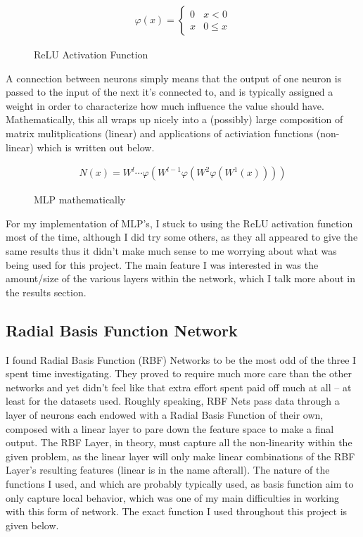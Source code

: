\documentclass[12pt, twoside]{report}
\begin{document}
\begin{figure}[H]
    \centering
    \begin{align}
        \varphi(x) = \begin{cases} 
            0 & x < 0 \\
            x & 0 \leq x
        \end{cases}
    \end{align}
    \caption*{ReLU Activation Function}
\end{figure}

A connection between neurons simply means that the output of one neuron is passed to the input of the next
it's connected to, and is typically assigned a weight in order to characterize how much influence the value
should have. Mathematically, this all wraps up nicely into a (possibly) large composition of matrix 
mulitplications (linear) and applications of activiation functions (non-linear) which is written out
below.

\begin{figure}[H]
    \centering
    \begin{align}
        N(x) = W^l \cdots \varphi(W^{l-1} \varphi(W^2\varphi(W^1(x))))
    \end{align}
    \caption*{MLP mathematically}
\end{figure}

For my implementation of MLP's, I stuck to using the ReLU activation function most of the time,
although I did try some others, as they all appeared to give the same results thus it didn't make much
sense to me worrying about what was being used for this project. The main feature I was interested in was
the amount/size of the various layers within the network, which I talk more about in the results section.

\subsection{Radial Basis Function Network}

I found Radial Basis Function (RBF) Networks to be the most odd of the three I spent time investigating.
They proved to require much more care than the other networks and yet didn't feel like that extra effort
spent paid off much at all – at least for the datasets used. Roughly speaking, RBF Nets pass data through
a layer of neurons each endowed with a Radial Basis Function of their own, composed with a linear layer
to pare down the feature space to make a final output. The RBF Layer, in theory, must capture all the 
non-linearity within the given problem, as the linear layer will only make linear combinations of the 
RBF Layer's resulting features (linear is in the name afterall). The nature of the functions I used, and 
which are probably typically used, as basis function aim to only capture local behavior, which was one 
of my main difficulties in working with this form of network.
The exact function I used throughout this project is given below.
\end{document}
